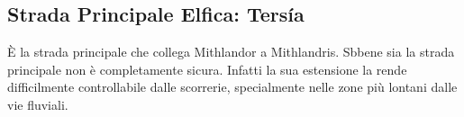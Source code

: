 \subsection{Strada Principale Elfica: Ters\'ia}
\`E la strada principale che collega Mithlandor a Mithlandris. Sbbene sia la strada principale non \`e completamente sicura. Infatti la sua estensione la rende difficilmente controllabile dalle scorrerie, specialmente nelle zone pi\`u lontani dalle vie fluviali. 

